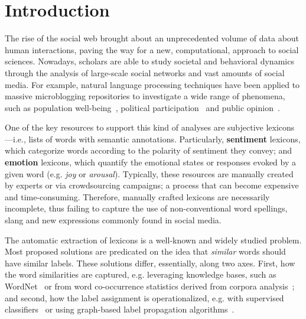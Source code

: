 \documentclass[letterpaper]{article}
\begin{document}
\section{Introduction}

The rise of the social web brought about an unprecedented volume of data about human interactions, paving the way for a new, computational, approach to social sciences. Nowadays, scholars are able to study societal and behavioral dynamics through the analysis of large-scale social networks and vast amounts of social media. For example, natural language processing techniques have been applied to massive microblogging repositories to investigate a wide range of phenomena, such as population well-being~\cite{Mitchell2013}, political participation~\cite{tumasjan2010predicting} and public opinion~\cite{O'Connor2010}. 

One of the key resources to support this kind of analyses are subjective lexicons---i.e., lists of words with semantic annotations. Particularly, \textbf{sentiment} lexicons, which categorize words according to the polarity of sentiment they convey; and \textbf{emotion} lexicons, which quantify the emotional states or responses evoked by a given word (e.g. \textit{joy} or \textit{arousal}). Typically, these resources are manually created by experts or via crowdsourcing campaigns; a process that can become expensive and time-consuming. Therefore, manually crafted lexicons are necessarily incomplete, thus failing to capture the use of non-conventional word spellings, slang and new expressions commonly found in social media. 

The automatic extraction of lexicons is a well-known and widely studied problem. Most proposed solutions are predicated on the idea that \textit{similar} words should have similar labels. These solutions differ, essentially, along two axes. First, how the word similarities are captured, e.g. leveraging knowledge bases, such as WordNet~\cite{hu2004mining} or from word co-occurrence statistics derived from corpora analysis~\cite{Bestgen12Checking}; and second, how the label assignment is operationalized, e.g. with supervised classifiers~\cite{esuli2006sentiwordnet} or using graph-based label propagation algorithms~\cite{rao2009semi}. 
\end{document}
